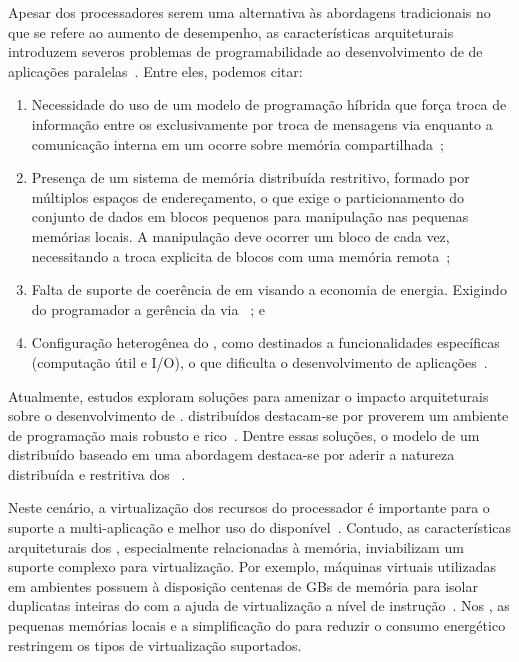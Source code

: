 Apesar dos processadores \lws serem uma alternativa às abordagens tradicionais no que se refere ao aumento de desempenho, as características arquiteturais introduzem severos problemas de programabilidade ao desenvolvimento de \software de aplicações paralelas~\cite{Castro-PARCO:2016}. Entre eles, podemos citar:

\begin{enumerate}[label= (\roman*)]
    \item Necessidade do uso de um modelo de programação híbrida que força troca de informação entre os \clusters exclusivamente por troca de mensagens via \noc enquanto a comunicação interna em um \cluster ocorre sobre memória compartilhada~\cite{kelly2013};
    \item Presença de um sistema de memória distribuída restritivo, formado por múltiplos espaços de endereçamento, o que exige o particionamento do conjunto de dados em blocos pequenos para manipulação nas pequenas memórias locais. A manipulação deve ocorrer um bloco de cada vez, necessitando a troca explicita de blocos com uma memória remota~\cite{Castro-PARCO:2016};
    \item Falta de suporte de coerência de \cache em \hardware visando a economia de energia. Exigindo do programador a gerência da \cache via \software~\cite{francesquini2015}; e
    \item Configuração heterogênea do \hardware, como \clusters destinados a funcionalidades específicas (computação útil e I/O), o que dificulta o desenvolvimento de aplicações~\cite{barbalace2015popcorn}.
\end{enumerate}

Atualmente, estudos exploram soluções para amenizar o impacto arquiteturais sobre o desenvolvimento de \software. \oss distribuídos destacam-se por proverem um ambiente de programação mais robusto e rico~\cite{asmussen_m3:_2016, kluge_operating_2014, penna:sbesc19}. Dentre essas soluções, o modelo de um \os distribuído baseado em uma abordagem \multikernel destaca-se por aderir a natureza distribuída e restritiva dos \lws~\cite{penna2017-1,penna2017-2,penna2019}.

Neste cenário, a virtualização dos recursos do processador é importante para o suporte a multi-aplicação e melhor uso do \hardware disponível~\cite{vanz2022virtualizaccao}. Contudo, as características arquiteturais dos \lws, especialmente relacionadas à memória, inviabilizam um suporte complexo para virtualização. Por exemplo, máquinas virtuais utilizadas em ambientes \cloud possuem à disposição centenas de GBs de memória para isolar duplicatas inteiras do \os com a ajuda de virtualização a nível de instrução~\cite{sharma2016containers}. Nos \lws, as pequenas memórias locais e a simplificação do \hardware para reduzir o consumo energético restringem os tipos de virtualização suportados.

